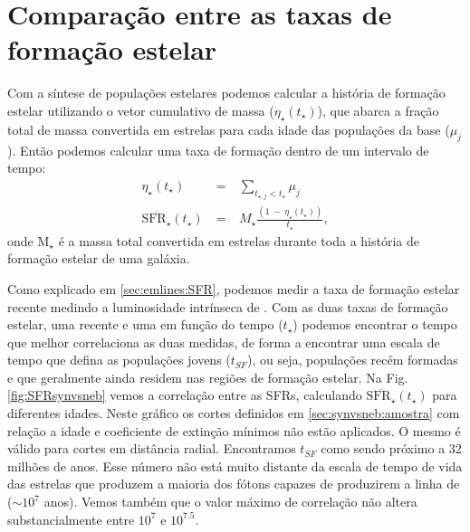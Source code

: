 \section{Comparação entre as taxas de formação estelar}
\label{sec:synvsneb:SFR}

Com a síntese de populações estelares podemos calcular a história de formação estelar utilizando o
vetor cumulativo de massa ($\eta_\star(t_\star)$), que abarca a fração total de massa convertida em
estrelas para cada idade das populações da base ($\mu_j$). Então podemos calcular uma taxa de
formação dentro de um intervalo de tempo:
\begin{eqnarray}
	\eta_\star(t_\star)\ &=&\ \sum\limits_{t_{\star,j} < t_\star} \mu_j \\
	\overline{\mathrm{SFR}_\star}(t_\star)\ &=&\ M_\star \frac{(1\ -\ \eta_\star(t_\star))}{t_\star},
\end{eqnarray}
\noindent onde M${}_\star$ é a massa total convertida em estrelas durante toda a história de
formação estelar de uma galáxia. 

Como explicado em \ref{sec:emlines:SFR}, podemos medir a taxa de formação estelar recente medindo a
luminosidade intrínseca de \Halpha. Com as duas taxas de formação estelar, uma recente e uma em
função do tempo ($t_\star$) podemos encontrar o tempo que melhor correlaciona as duas medidas, de
forma a encontrar uma escala de tempo que defina as populações jovens ($t_{SF}$), ou seja,
populações recém formadas e que geralmente ainda residem nas regiões de formação estelar. Na Fig.
\ref{fig:SFRsynvsneb} vemos a correlação entre as SFRs, calculando
$\overline{\mathrm{SFR}_\star}(t_\star)$ para diferentes idades. Neste gráfico os cortes
definidos em \ref{sec:synvsneb:amostra} com relação a idade e coeficiente de extinção mínimos não
estão aplicados. O mesmo é válido para cortes em distância radial. Encontramos $t_{SF}$ como sendo
próximo a 32 milhões de anos. Esse número não está muito distante da escala de tempo de vida das
estrelas que produzem a maioria dos fótons capazes de produzirem a linha de \Halpha ($\sim10^7$
anos). Vemos também que o valor máximo de correlação não altera substancialmente entre $10^7$ e
$10^{7.5}$.

